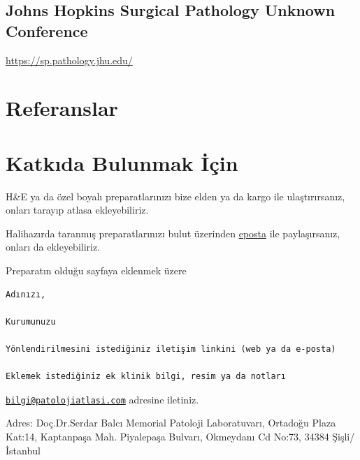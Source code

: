\documentclass[
  letterpaper,
  DIV=11,
  numbers=noendperiod]{scrreprt}
\newlength{\cslhangindent}
\newlength{\cslentryspacingunit} %
\newenvironment{CSLReferences}[2] %
 {%
  \setlength{\parindent}{0pt}
  \ifodd #1
  \let\oldpar\par
  \def\par{\hangindent=\cslhangindent\oldpar}
  \fi
  \setlength{\parskip}{#2\cslentryspacingunit}
 }%
 {}
\begin{document}
\hypertarget{johns-hopkins-surgical-pathology-unknown-conference}{%
\section{Johns Hopkins Surgical Pathology Unknown
Conference}\label{johns-hopkins-surgical-pathology-unknown-conference}}

\url{https://sp.pathology.jhu.edu/}


\hypertarget{referanslar}{%
\chapter*{Referanslar}\label{referanslar}}


\hypertarget{refs}{}
\begin{CSLReferences}{0}{0}
\end{CSLReferences}

\cleardoublepage
{}
{}
\appendix

\hypertarget{sec-katki}{%
\chapter{Katkıda Bulunmak İçin}\label{sec-katki}}

H\&E ya da özel boyalı preparatlarınızı bize elden ya da kargo ile
ulaştırırsanız, onları tarayıp atlasa ekleyebiliriz.

Halihazırda taranmış preparatlarınızı bulut üzerinden
\href{mailto:bilgi@patolojiatlasi.com}{eposta} ile paylaşırsanız, onları
da ekleyebiliriz.

Preparatın olduğu sayfaya eklenmek üzere

\begin{verbatim}
Adınızı,

Kurumunuzu

Yönlendirilmesini istediğiniz iletişim linkini (web ya da e-posta)

Eklemek istediğiniz ek klinik bilgi, resim ya da notları
\end{verbatim}

\href{mailto:bilgi@patolojiatlasi.com}{\nolinkurl{bilgi@patolojiatlasi.com}}
adresine iletiniz.

Adres: Doç.Dr.Serdar Balcı Memorial Patoloji Laboratuvarı, Ortadoğu
Plaza Kat:14, Kaptanpaşa Mah. Piyalepaşa Bulvarı, Okmeydanı Cd No:73,
34384 Şişli/İstanbul
\end{document}

